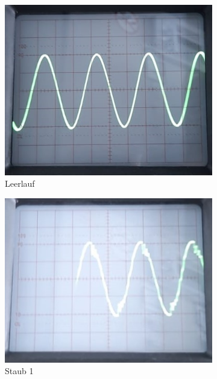 \begin{figure}[H]
	\centering
	\begin{subfigure}[c]{0.19\textwidth}
		\includegraphics[width=\textwidth]{Abbildungen/Oszi_Leerlauf.jpg}
		\caption{Leerlauf}
	\end{subfigure}
	\begin{subfigure}[c]{0.19\textwidth}
		\includegraphics[width=\textwidth]{Abbildungen/Oszi_Staub_1.jpg}
		\caption{Staub 1}
	\end{subfigure}
	\begin{subfigure}[c]{0.19\textwidth}

\end{subfigure}
\end{figure}
